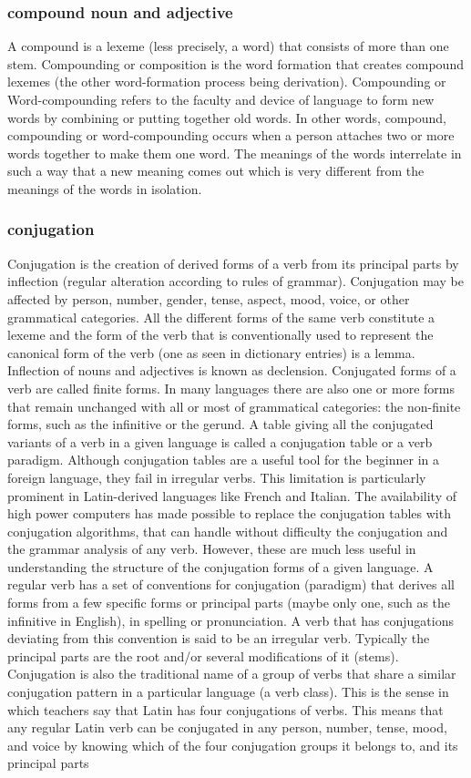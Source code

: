 \begin{small}
\subsubsection{compound noun and adjective}
 A compound is a lexeme (less precisely, a word) that consists of more than one stem. Compounding or composition is the word formation that creates compound lexemes (the other word-formation process being derivation). Compounding or Word-compounding refers to the faculty and device of language to form new words by combining or putting together old words. In other words, compound, compounding or word-compounding occurs when a person attaches two or more words together to make them one word. The meanings of the words interrelate in such a way that a new meaning comes out which is very different from the meanings of the words in isolation.

\subsubsection{conjugation}Conjugation is the creation of derived forms of a verb from its principal parts by inflection (regular alteration according to rules of grammar). Conjugation may be affected by person, number, gender, tense, aspect, mood, voice, or other grammatical categories. All the different forms of the same verb constitute a lexeme and the form of the verb that is conventionally used to represent the canonical form of the verb (one as seen in dictionary entries) is a lemma. Inflection of nouns and adjectives is known as declension.  Conjugated forms of a verb are called finite forms. In many languages there are also one or more forms that remain unchanged with all or most of grammatical categories: the non-finite forms, such as the infinitive or the gerund. A table giving all the conjugated variants of a verb in a given language is called a conjugation table or a verb paradigm.  Although conjugation tables are a useful tool for the beginner in a foreign language, they fail in irregular verbs. This limitation is particularly prominent in Latin-derived languages like French and Italian. The availability of high power computers has made possible to replace the conjugation tables with conjugation algorithms, that can handle without difficulty the conjugation and the grammar analysis of any verb. However, these are much less useful in understanding the structure of the conjugation forms of a given language.  A regular verb has a set of conventions for conjugation (paradigm) that derives all forms from a few specific forms or principal parts (maybe only one, such as the infinitive in English), in spelling or pronunciation. A verb that has conjugations deviating from this convention is said to be an irregular verb. Typically the principal parts are the root and/or several modifications of it (stems).  Conjugation is also the traditional name of a group of verbs that share a similar conjugation pattern in a particular language (a verb class). This is the sense in which teachers say that Latin has four conjugations of verbs. This means that any regular Latin verb can be conjugated in any person, number, tense, mood, and voice by knowing which of the four conjugation groups it belongs to, and its principal parts


\end{small}
